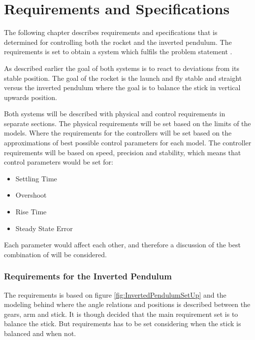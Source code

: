 \chapter{Requirements and Specifications}
The following chapter describes requirements and specifications that is determined for controlling both the rocket and the inverted pendulum. The requirements is set to obtain a system which fulfils the problem statement .

As described earlier the goal of both systems is to react to deviations from its stable position. The goal of the rocket is the launch and fly stable and straight versus the inverted pendulum where the goal is to balance the stick in vertical upwards position.  

Both systems will be described with physical and control requirements in separate sections. The physical requirements will be set based on the limits of the models. Where the requirements for the controllers will be set based on the approximations of best possible control parameters for each model.  
The controller requirements will be based on speed, precision and stability, which means that control parameters would be set for:

\begin{itemize}[noitemsep]
\item Settling Time
\item Overshoot
\item Rise Time
\item Steady State Error
\end{itemize}

Each parameter would affect each other, and therefore a discussion of the best combination of will be considered.
\newpage
\subsection{Requirements for the Inverted Pendulum}
The requirements is based on figure \ref{fig:InvertedPendulumSetUp} and the modeling behind where the angle relations and positions is described between the gears, arm and stick. It is though decided that the main requirement set is to balance the stick. But requirements has to be set considering when the stick is balanced and when not. 

\setlength{\parindent}{0pt}
\newcommand{\forceindent}{\leavevmode{\parindent=1em\indent}}


